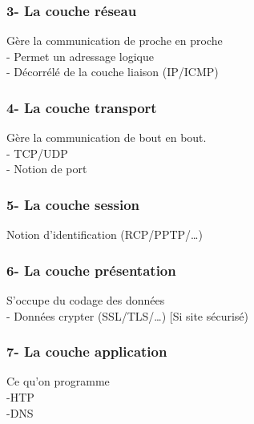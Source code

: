 \documentclass{article}
\begin{document}
\subsubsection*{3- La couche réseau}
Gère la communication de proche en proche \\ 
- Permet un adressage logique \\
- Décorrélé de la couche liaison (IP/ICMP) \\
\subsubsection*{4- La couche transport}
Gère la communication de bout en bout. \\
- TCP/UDP \\
- Notion de port \\
\subsubsection*{5- La couche session}
Notion d’identification (RCP/PPTP/…)
\subsubsection*{6- La couche présentation}
S’occupe du codage des données \\
- Données crypter (SSL/TLS/…) [Si site sécurisé) \\
\subsubsection*{7- La couche application}
Ce qu’on programme \\
-HTP \\
-DNS \\

\newpage
\end{document}

